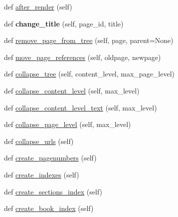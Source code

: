 \begin{DoxyCompactItemize}
\item 
def \hyperlink{classtexla_1_1PageTree_1_1PageTree_1_1PageTree_aef29edcb58ecab6f73b2fc00105bfd32}{after\+\_\+render} (self)
\item 
\hypertarget{classtexla_1_1PageTree_1_1PageTree_1_1PageTree_af00c05b145278ad8e9b4b67b9871ec28}{}\label{classtexla_1_1PageTree_1_1PageTree_1_1PageTree_af00c05b145278ad8e9b4b67b9871ec28} 
def {\bfseries change\+\_\+title} (self, page\+\_\+id, title)
\item 
def \hyperlink{classtexla_1_1PageTree_1_1PageTree_1_1PageTree_a4766b39f5fa963645b80afbb52c2c051}{remove\+\_\+page\+\_\+from\+\_\+tree} (self, page, parent=None)
\item 
def \hyperlink{classtexla_1_1PageTree_1_1PageTree_1_1PageTree_a0eefaf0f844683ae949fa1120f9179d3}{move\+\_\+page\+\_\+references} (self, oldpage, newpage)
\item 
def \hyperlink{classtexla_1_1PageTree_1_1PageTree_1_1PageTree_ae913f178f121266966856b75dde090f4}{collapse\+\_\+tree} (self, content\+\_\+level, max\+\_\+page\+\_\+level)
\item 
def \hyperlink{classtexla_1_1PageTree_1_1PageTree_1_1PageTree_af7af6e47f12cf9a4b37b6d3109bf6b63}{collapse\+\_\+content\+\_\+level} (self, max\+\_\+level)
\item 
def \hyperlink{classtexla_1_1PageTree_1_1PageTree_1_1PageTree_ac4014d964d66c7a28b6ad2817c627bfd}{collapse\+\_\+content\+\_\+level\+\_\+text} (self, max\+\_\+level)
\item 
def \hyperlink{classtexla_1_1PageTree_1_1PageTree_1_1PageTree_aad58c1721ddcdd1e6e3ba7ad0248b4d7}{collapse\+\_\+page\+\_\+level} (self, max\+\_\+level)
\item 
def \hyperlink{classtexla_1_1PageTree_1_1PageTree_1_1PageTree_a5f9436e36fa9fdd44f5e219cec82c672}{collapse\+\_\+urls} (self)
\item 
def \hyperlink{classtexla_1_1PageTree_1_1PageTree_1_1PageTree_ac21290653e2f62b62d23d61ad0f856bd}{create\+\_\+pagenumbers} (self)
\item 
def \hyperlink{classtexla_1_1PageTree_1_1PageTree_1_1PageTree_ae836d3ae69f72eca37fd306e64baba50}{create\+\_\+indexes} (self)
\item 
def \hyperlink{classtexla_1_1PageTree_1_1PageTree_1_1PageTree_a3ff84eeb07714017d2048fe7a92be982}{create\+\_\+sections\+\_\+index} (self)
\item 
def \hyperlink{classtexla_1_1PageTree_1_1PageTree_1_1PageTree_a66e4934e3bf44c7901147388e2987900}{create\+\_\+book\+\_\+index} (self)
\end{DoxyCompactItemize}
